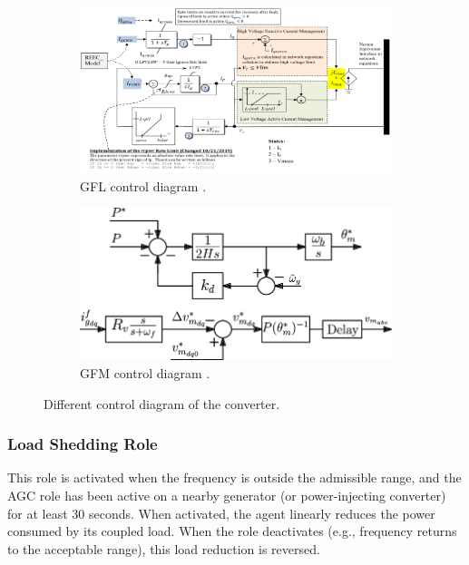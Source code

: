 \documentclass{article}
\begin{document}
\begin{figure}[htbp]
    \centering
    \begin{subfigure}[t]{0.90\textwidth}
        \centering
        \includegraphics[width=\linewidth]{plots/gfl_diagram.png}
        \caption{GFL control diagram \cite{diagram:gfl}.}
        \label{fig:control_gfl}
    \end{subfigure}
    \hfill
    \begin{subfigure}[t]{0.52\textwidth}
        \centering
        \includegraphics[width=\linewidth]{plots/gfm_diagram.png}
        \caption{GFM control diagram \cite{diagram:gfm}.}
        \label{fig:colmena_gfm}
    \end{subfigure}
    \caption{Different control diagram of the converter.}
    \label{fig:gflgfm}
\end{figure}


\subsubsection*{Load Shedding Role}

This role is activated when the frequency is outside the admissible range, and the AGC role has been active on a nearby generator (or power-injecting converter) for at least 30 seconds. When activated, the agent linearly reduces the power consumed by its coupled load. When the role deactivates (e.g., frequency returns to the acceptable range), this load reduction is reversed.
\end{document}
